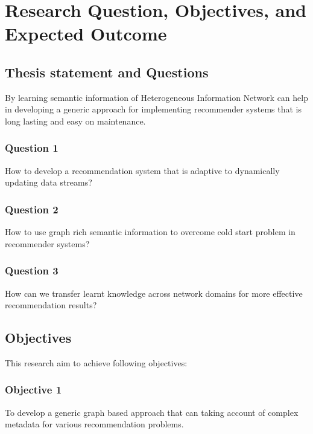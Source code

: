 \section{Research Question, Objectives, and Expected Outcome}

\subsection{Thesis statement and Questions}
By learning semantic information of Heterogeneous Information Network can help in developing a generic approach for implementing recommender systems that is long lasting and easy on maintenance. 

\subsubsection*{Question 1}
How to develop a recommendation system that is adaptive to dynamically updating data streams?

\subsubsection*{Question 2}
How to use graph rich semantic information to overcome cold start problem in recommender systems?

\subsubsection*{Question 3}
How can we transfer learnt knowledge across network domains for more effective recommendation results?

\subsection{Objectives}
This research aim to achieve following objectives: 

\subsubsection*{Objective 1}
To develop a generic graph based  approach that can taking account of complex metadata for various recommendation problems.


